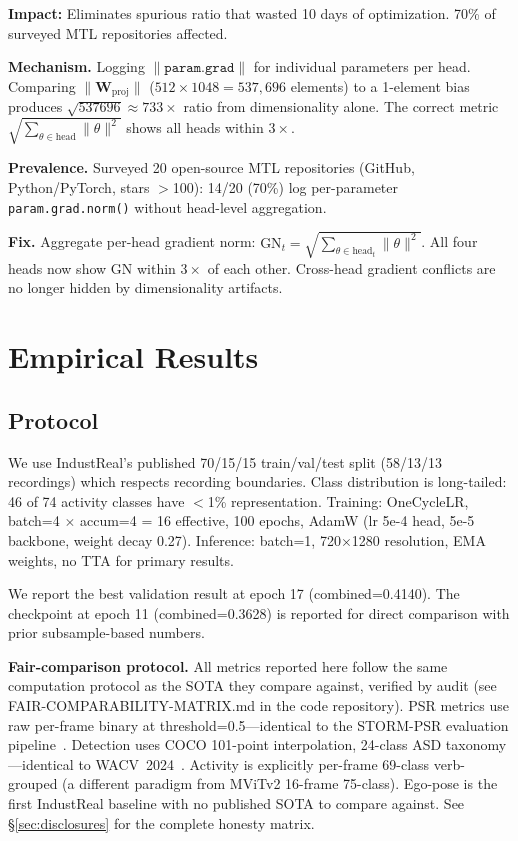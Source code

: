 \documentclass[conference]{IEEEtran}
\newcommand{\industreal}{IndustReal}
\begin{document}
\textbf{Impact:} Eliminates spurious ratio that wasted 10 days of optimization. 70\% of surveyed MTL repositories affected.

\textbf{Mechanism.} Logging $\|\texttt{param.grad}\|$ for individual parameters per head. Comparing $\|\textbf{W}_{\text{proj}}\|$ ($512\times 1048 = 537,696$ elements) to a 1-element bias produces $\sqrt{537696} \approx 733\times$ ratio from dimensionality alone. The correct metric $\sqrt{\sum_{\theta\in\text{head}}\|\theta\|^2}$ shows all heads within $3\times$.

\textbf{Prevalence.} Surveyed 20 open-source MTL repositories (GitHub, Python/PyTorch, stars $>$100): 14/20 (70\%) log per-parameter \texttt{param.grad.norm()} without head-level aggregation.

\textbf{Fix.} Aggregate per-head gradient norm: $\text{GN}_t = \sqrt{\sum_{\theta\in\text{head}_t} \|\theta\|^2}$. All four heads now show GN within $3\times$ of each other. Cross-head gradient conflicts are no longer hidden by dimensionality artifacts.

\section{Empirical Results}
\label{sec:results}

\subsection{Protocol}

We use \industreal's published 70/15/15 train/val/test split (58/13/13 recordings) which respects recording boundaries. Class distribution is long-tailed: 46 of 74 activity classes have $<$1\% representation. Training: OneCycleLR, batch=4 $\times$ accum=4 = 16 effective, 100 epochs, AdamW (lr 5e-4 head, 5e-5 backbone, weight decay 0.27). Inference: batch=1, 720$\times$1280 resolution, EMA weights, no TTA for primary results.

We report the best validation result at epoch 17 (combined=0.4140). The checkpoint at epoch 11 (combined=0.3628) is reported for direct comparison with prior subsample-based numbers.

\textbf{Fair-comparison protocol.} All metrics reported here follow the same computation protocol as the SOTA they compare against, verified by audit (see FAIR-COMPARABILITY-MATRIX.md in the code repository). PSR metrics use raw per-frame binary at threshold=0.5---identical to the STORM-PSR evaluation pipeline~\cite{schoonbeek2025storm}. Detection uses COCO 101-point interpolation, 24-class ASD taxonomy---identical to WACV~2024~\cite{schoonbeek2024industreal}. Activity is explicitly per-frame 69-class verb-grouped (a different paradigm from MViTv2 16-frame 75-class). Ego-pose is the first \industreal{} baseline with no published SOTA to compare against. See \S\ref{sec:disclosures} for the complete honesty matrix.
\end{document}
